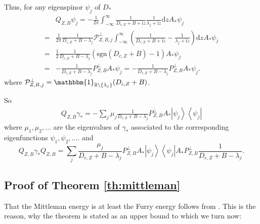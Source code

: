 \documentclass[a4paper]{amsart}
\def\R{\mathbb{R}}
\def\rd{\mathrm{d}}
\def\ri{\mathrm{i}}
\def\sgn{\mathrm{sgn}} %
\begin{document}
Thus, for any eigenspinor $\psi_j$ of $D_*$
\begin{equation}
  \begin{split}
     &Q_{Z,B}\psi_j=-\frac{1}{2\pi}\int_{-\infty}^{\infty}\frac{1}{D_{c,Z}+B+\ri z}\frac{1}{\lambda_j+\ri z}\rd z A_*\psi_j\\
    = &\frac{1}{2\pi} \frac{1}{D_{c,Z}+B -\lambda_j}\mathcal{P}_{Z,B,j}^\perp \int_{-\infty}^{\infty}\left( \frac{1}{D_{c,Z}+B+\ri z} -\frac{1}{\lambda_j+\ri z}\right) \rd z A_*\psi_j\\
    = &\frac{1}{2} \frac{1}{D_{c,Z}+B-\lambda_j}  \left(\sgn(D_{c,Z}+B)-1\right)A_*\psi_j\\
  = &- \frac{1}{D_{c,Z}+B  -\lambda_j} P^\perp_{Z,B}
     A_*\psi_j=  - \frac{1}{D_{c,Z}+B  -\lambda_j} P^\perp_{Z,B} A_*\psi_j.
  \end{split}
\end{equation}
where $\mathcal{P}_{Z,B,j}^\perp= \mathbbm{1}_{\R\setminus\{\lambda_j\}}(D_{c,Z}+B)$.

So
\begin{align}\label{eq:P1-gamma*}
    Q_{Z,B}\gamma_*= -\sum_{j}\mu_j \frac{1}{D_{c,Z}+B -\lambda_j} P^\perp_{Z,B} A_*\left|\psi_j\right>\left<\psi_j\right|
\end{align}
where $\mu_1,\mu_2,...$ are the eigenvalues of $\gamma_*$ associated to the corresponding eigenfunctions $\psi_1,\psi_2,...$.
and
\begin{equation}\label{eq:P1-gamma*-P1}
  Q_{Z,B}\gamma_*Q_{Z,B}
     = \sum_{j} \frac{\mu_j}{D_{c,Z}+B -\lambda_j} P^\perp_{Z,B} A_*\left|\psi_j\right>\left<\psi_j\right|A_* P_{Z,B}^{\perp}\frac{1}{D_{c,Z}+B -\lambda_j}.
 \end{equation}

\subsection{Proof of Theorem \ref{th:mittleman}}\label{sec:mittleman}

That the Mittleman energy is at least the Furry energy follows from
\cite{HandrekSiedentop2015}. This is the reason, why the theorem is
stated as an upper bound to which we turn now:
\end{document}
